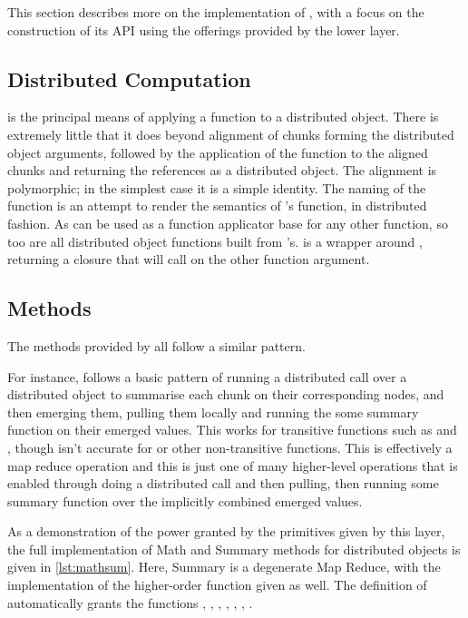 This section describes more on the implementation of \lso{}, with a focus on the construction of its API using the offerings provided by the lower layer.

\subsection{Distributed Computation}

 is the principal means of applying a function to a distributed object.
There is extremely little that it does beyond alignment of chunks forming the distributed object arguments, followed by the application of the function to the aligned chunks and returning the references as a distributed object.
The alignment is polymorphic; in the simplest case it is a simple identity.
The naming of the function is an attempt to render the semantics of \R{}'s  function, in distributed fashion.
As  can be used as a function applicator base for any other function, so too are all distributed object functions built from 's.
 is a wrapper around , returning a closure that will call  on the other function argument.

\subsection{Methods}

The methods provided by \lso{} all follow a similar pattern.

For instance,  follows a basic pattern of running a distributed call over a distributed object to summarise each chunk on their corresponding nodes, and then emerging them, pulling them locally and running the some summary function on their  emerged values.
This works for transitive functions such as  and , though isn't accurate for  or other non-transitive functions.
This is effectively a map reduce operation and this is just one of many higher-level operations that is enabled through doing a distributed call and then pulling, then running some summary function over the implicitly combined emerged values.

As a demonstration of the power granted by the primitives given by this layer, the full implementation of Math and Summary methods for distributed objects is given in \cref{lst:mathsum}.
Here, Summary is a degenerate Map Reduce, with the implementation of the higher-order  function given as well. The definition of  automatically grants the functions , , , , , , . 

